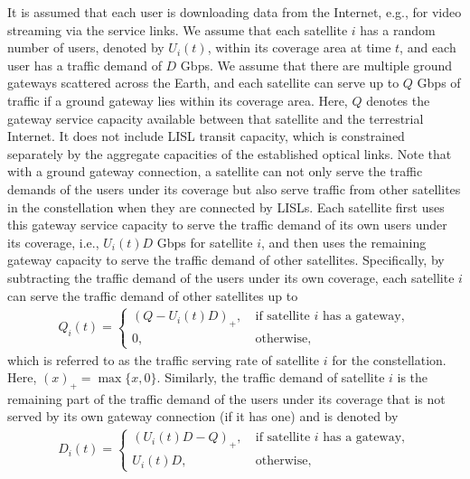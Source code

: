 \documentclass[journal]{IEEEtran}
\begin{document}
It is assumed that each user is downloading data from the Internet, e.g., for video streaming via the service links. We assume that each satellite $i$ has a random number of users, denoted by $U_i(t)$, within its coverage area at time $t$, and each user has a traffic demand of $D$ Gbps.
We assume that there are multiple ground gateways scattered across the Earth, and each satellite can serve up to $Q$ Gbps of traffic if a ground gateway lies within its coverage area. 
Here, $Q$ denotes the gateway service capacity available between that satellite and the terrestrial Internet. It does not include LISL transit capacity, which is constrained separately by the aggregate capacities of the established optical links.
Note that with a ground gateway connection, a satellite can not only serve the traffic demands of the users under its coverage but also serve traffic from other satellites in the constellation when they are connected by LISLs.
Each satellite first uses this gateway service capacity to serve the traffic demand of its own users under its coverage, i.e., $U_i(t) D$ Gbps for satellite $i$, and then uses the remaining gateway capacity to serve the traffic demand of other satellites.
Specifically, by subtracting the traffic demand of the users under its own coverage, each satellite $i$ can serve the traffic demand of other satellites up to
\begin{equation}
  \begin{aligned}
    Q_i(t) = \begin{cases}
      (Q - U_i(t) D)_{+},\ &\text{if satellite $i$ has a gateway},\\
      0,\ &\text{otherwise},
    \end{cases}    
  \end{aligned}
\end{equation}
which is referred to as the traffic serving rate of satellite $i$ for the constellation. Here, $(x)_{+} = \max\{x,0\}$. 
Similarly, the traffic demand of satellite $i$ is the remaining part of the traffic demand of the users under its coverage that is not served by its own gateway connection (if it has one) and is denoted by
\begin{equation}
  \begin{aligned}
    D_i(t) = \begin{cases}
      (U_i(t) D-Q)_{+},\ &\text{if satellite $i$ has a gateway},\\
      U_i (t)D,\ &\text{otherwise},
    \end{cases}    
  \end{aligned}
\end{equation}
\end{document}
